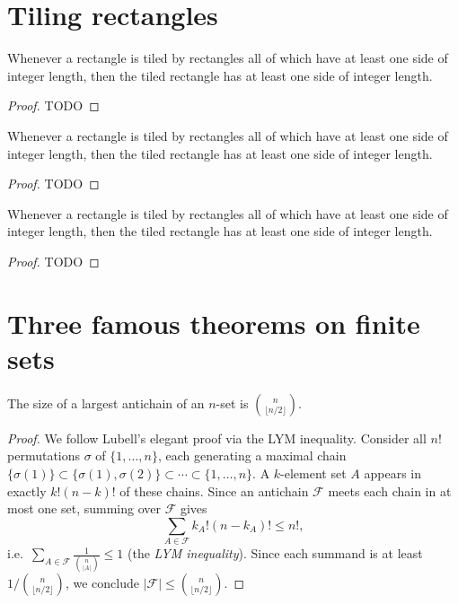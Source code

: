 \chapter{Tiling rectangles}

\begin{theorem}
  \label{tiling_rectangles1}
  Whenever a rectangle is tiled by rectangles all of which have at least
  one side of integer length, then the tiled rectangle has
  at least one side of integer length.
\end{theorem}
\begin{proof}
  TODO
\end{proof}

\begin{theorem}
  \label{tiling_rectangles2}
  Whenever a rectangle is tiled by rectangles all of which have at least
  one side of integer length, then the tiled rectangle has
  at least one side of integer length.
\end{theorem}
\begin{proof}
  TODO
\end{proof}

\begin{theorem}
  \label{tiling_rectangles3}
  Whenever a rectangle is tiled by rectangles all of which have at least
  one side of integer length, then the tiled rectangle has
  at least one side of integer length.
\end{theorem}
\begin{proof}
  TODO
\end{proof}


\chapter{Three famous theorems on finite sets}
\label{chapter30}

\begin{theorem}
  \label{ch30theorem1}
  \leanok
  The size of a largest antichain of an $n$-set is $\binom{n}{\lfloor n/2\rfloor}$.
\end{theorem}
\begin{proof}
  \leanok
  We follow Lubell's elegant proof via the LYM inequality.
  Consider all $n!$ permutations $\sigma$ of $\{1,\dots,n\}$, each generating
  a maximal chain $\{\sigma(1)\} \subset \{\sigma(1),\sigma(2)\} \subset \cdots \subset \{1,\dots,n\}$.
  A $k$-element set $A$ appears in exactly $k!(n-k)!$ of these chains. Since an antichain
  $\mathcal{F}$ meets each chain in at most one set, summing over $\mathcal{F}$ gives
  \[
    \sum_{A \in \mathcal{F}} k_A!(n-k_A)! \le n!,
  \]
  i.e.\ $\sum_{A \in \mathcal{F}} \frac{1}{\binom{n}{|A|}} \le 1$
  (the \emph{LYM inequality}). Since each summand is at least $1/\binom{n}{\lfloor n/2\rfloor}$,
  we conclude $|\mathcal{F}| \le \binom{n}{\lfloor n/2\rfloor}$.
\end{proof}

